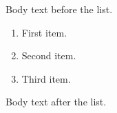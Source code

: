 \documentclass{article}
\begin{document}
Body text before the list.

\begin{enumerate}
  \item First item.
  \item Second item.
  \item Third item.
\end{enumerate}

Body text after the list.
\end{document}
